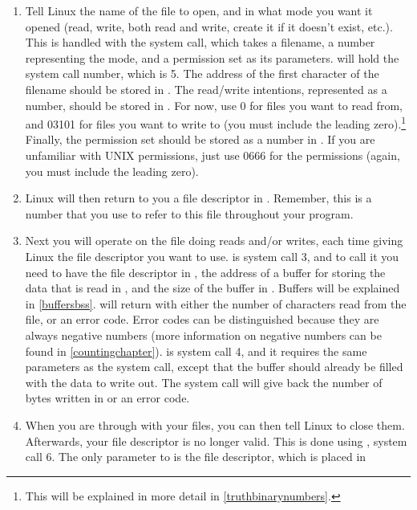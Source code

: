 \begin{enumerate}
\item Tell Linux the name of the file to open, and in what mode you want it 
opened (read, write, both read and write, create it if it doesn't exist, 
etc.).  This is handled with the 
system call, which takes a filename, a number representing the mode, 
and a permission set as its parameters.  {\eaxRegIdx} will hold the system call number, which is 5.
The address of the first character of the filename should be stored
in {\ebxRegIdx}.  The read/write intentions, represented as 
a number, should be stored in {\ecxRegIdx}.  For now, use 0 for files you want to read
from, and 03101 for files you want to write to 
(you must include the leading zero).\footnote{This will be explained 
in more detail in \autoref{truthbinarynumbers}.}  
Finally, the permission set should be stored as a number in {\edxRegIdx}.  
If you are unfamiliar with UNIX permissions, just use 0666 for the 
permissions (again, you must include the leading zero). 
\item Linux will then return to you a file descriptor in 
{\eaxRegIdx}.  Remember, this is a number that you use to refer to this file 
throughout your program. 
\item Next you will operate on the file doing reads and/or writes, each time 
giving Linux the file descriptor you want to use.  
is system call 3, and to call it you need to have the file descriptor
in {\ebxReg}, the address of a buffer for storing the 
data that is read in {\ecxReg}, and the size of the buffer in {\edxReg}.  
Buffers will be explained in \autoref{buffersbss}.
 will return with either the number of 
characters read from the file, or an error code.  Error codes can be
distinguished because they are always negative numbers (more information
on negative numbers can be found in \autoref{countingchapter}).  
is system call 4, and it requires the same 
parameters as the  system call, except that the
buffer should already be filled with the data to write out.  The 
 system call will give back the number
of bytes written in {\eaxReg} or an error code. 
\item When you are through with your files, you can then tell Linux to close them.  
Afterwards, your file descriptor is no longer valid.
This is done using , system call 6.  The only
parameter to  is the file descriptor, which is
placed in {\ebxReg} 
\end{enumerate}

